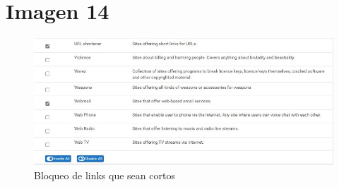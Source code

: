 \documentclass[12pt,letterspaper]{report}
\begin{document}
\chapter*{Imagen 14}
\vspace {0.3cm}
\begin{figure}[htb]
\centering
\includegraphics[scale=0.5]{Img14.jpg}
\caption{{Bloqueo de links que sean cortos}}
\end{figure}\par
\vspace {0.1cm}
\end{document}
